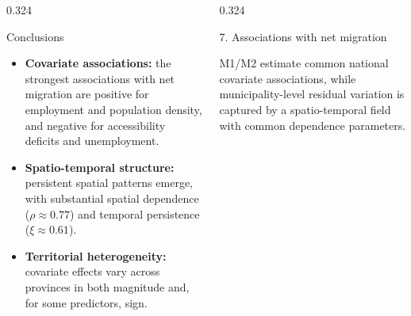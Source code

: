 \documentclass[final]{beamer}
\newcommand{\model}[1]{\textbf{#1}}
\begin{document}
\begin{frame}[t]
\begin{columns}[t,totalwidth=\textwidth]
\begin{column}{0.324\textwidth}
\begin{block}{Conclusions}
\begin{itemize}




\item \textbf{Covariate associations:}
the strongest associations with net migration are positive for employment and population density, and negative for accessibility deficits and unemployment.

\item \textbf{Spatio-temporal structure:}
persistent spatial patterns emerge, with substantial spatial dependence ($\rho \approx 0.77$) and temporal persistence ($\xi \approx 0.61$).
\item \textbf{Territorial heterogeneity:}
covariate effects vary across provinces in both magnitude and, for some predictors, sign.


\end{itemize}

\end{block}
\end{column}

\begin{column}{0.324\textwidth}

\begin{block}{7. Associations with net migration}

\justifying
M1/M2 estimate common national covariate associations, while municipality-level residual variation is captured by a spatio-temporal field with common dependence parameters. %



\end{block}
\end{column}
\end{columns}
\end{frame}
\end{document}
